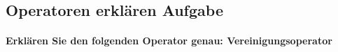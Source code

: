 
\subsection{Operatoren erklären Aufgabe}
\paragraph{Erklären Sie den folgenden Operator genau: Vereinigungsoperator}

